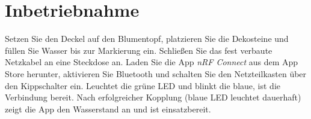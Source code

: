 %
%
%

\section{Inbetriebnahme}

Setzen Sie den Deckel auf den Blumentopf, platzieren Sie die Dekosteine und füllen Sie Wasser bis zur Markierung ein. Schließen Sie das fest verbaute Netzkabel an eine Steckdose an.
Laden Sie die App \textit{nRF Connect} aus dem App Store herunter, aktivieren Sie Bluetooth und schalten Sie den Netzteilkasten über den Kippschalter ein. Leuchtet die grüne LED und blinkt die blaue, ist die Verbindung bereit. Nach erfolgreicher Kopplung (blaue LED leuchtet dauerhaft) zeigt die App den Wasserstand an und ist einsatzbereit.


